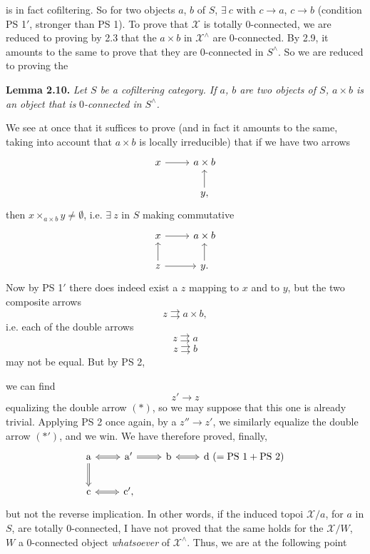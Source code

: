 \documentclass[11pt]{article}
\newcommand{\printedpage}[1]{\marginpar{\footnotesize p.~#1}}
\newcommand{\msp}[1]{\marginpar{\footnotesize [#1]}}
\newcommand{\X}{\mathcal{X}}
\begin{document}
\msp{page 26} is in fact cofiltering. So for two objects $a$, $b$ of $S$, $\exists\ c$ with $c\longrightarrow a$, $c\longrightarrow b$ (condition PS 1$'$, stronger than PS 1). To prove that $\X$ is totally 0-connected, we are reduced to proving by 2.3 that the $a\times b$ in $\X^\wedge$ are 0-connected. By 2.9, it amounts to the same to prove that they are 0-connected in $S^\wedge$. So we are reduced to proving the

\textbf{Lemma 2.10.} \textit{Let $S$ be a cofiltering category. If $a$, $b$ are two objects of $S$, $a\times b$ is an object that is} $0$\textit{-connected in $S^\wedge$.}

We see at once that it suffices to prove (and in fact it amounts to the same, taking into account that $a\times b$ is locally irreducible) that if we have two arrows
\[
\begin{tikzcd}
x \arrow[r] & a\times b \\
 & y, \arrow[u]
\end{tikzcd}
\]
then $x\times_{a\times b}y\neq\emptyset$, i.e. $\exists\ z$ in $S$ making commutative
\[
\begin{tikzcd}
x \arrow[r] & a\times b \\
z \arrow[u] \arrow[r] & y. \arrow[u]
\end{tikzcd}
\]
Now by PS 1$'$ there does indeed exist a $z$ mapping to $x$ and to $y$, but the two composite arrows
\[
z\rightrightarrows a\times b,
\]
i.e. each of the double arrows
\[
z\rightrightarrows a \tag*{$(*)$}
\]
\[
z\rightrightarrows b \tag*{$(*')$}
\]
may not be equal. But by PS 2,

\msp{page 27}we can find
\[
z'\longrightarrow z
\]
\printedpage{17}
equalizing the double arrow $(*)$, so we may suppose that this one is already trivial. Applying PS 2 once again, by a $z''\longrightarrow z'$, we similarly equalize the double arrow $(*')$, and we win. We have therefore proved, finally,
\[
\begin{tikzcd}
\mathrm{a} \arrow[r, Leftrightarrow] \arrow[d, Rightarrow] & \mathrm{a}' \arrow[r, Rightarrow] & \mathrm{b} \arrow[r, Leftrightarrow] & \mathrm{d}\ (=\mathrm{PS}\ 1+\mathrm{PS}\ 2) \\
\mathrm{c} \arrow[r, Leftrightarrow] & \mathrm{c}',
\end{tikzcd}
\]
but not the reverse implication. In other words, if the induced topoi $\X/a$, for $a$ in $S$, are totally 0-connected, I have not proved that the same holds for the $\X/W$, $W$ a 0-connected object \textit{whatsoever} of $\X^\wedge$. Thus, we are at the following point
\end{document}
